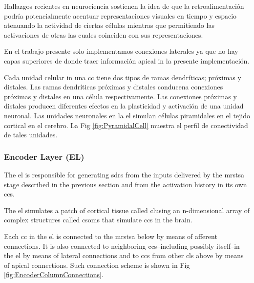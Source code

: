 {Hallazgos recientes en neurociencia \cite{Marques2018} sostienen la idea
de que la retroalimentación podría potencialmente acentuar representaciones visuales en tiempo y espacio
atenuando la actividad de ciertas células mientras que permitiendo las activaciones de otras
las cuales coinciden con sus representaciones.

En el trabajo presente solo implementamos conexiones laterales ya que
no hay capas superiores
de donde traer información apical in la presente implementación.

Cada unidad celular in una \gls{cc} tiene dos tipos de ramas dendríticas; próximas y distales.
Las ramas dendríticas próximas y distales conducena conexiones próximas y distales en una célula respectivamente.
Las conexiones próximas y distales producen diferentes efectos en la plasticidad y activación de una unidad neuronal.
Las unidades neuronales en la \gls{el} simulan células piramidales en el tejido cortical en el cerebro.
La Fig \ref{fig:PyramidalCell} muestra el perfil de conectividad de tales unidades.
}{
\subsubsection{Encoder Layer (EL)}

The \gls{el} is responsible for generating \glspl{sdr} from the inputs delivered by the \gls{mrstsa} stage
described in the previous section and from the activation history in its own \glspl{cc}.

The \gls{el} simulates a patch of cortical tissue called \gls{cl}using an n-dimensional array of complex structures called \glspl{csom} that simulate \glspl{cc} in the brain.

Each \gls{cc} in the \gls{el} is connected to the \gls{mrstsa} below by means of afferent connections. It is also
connected to neighboring \glspl{cc}--including possibly itself--in the \gls{el} by means of lateral connections and
to \glspl{cc} from other \glspl{cl} above by means of apical connections. Such connection scheme is shown in Fig \ref{fig:EncoderColumnConnections}.

}
